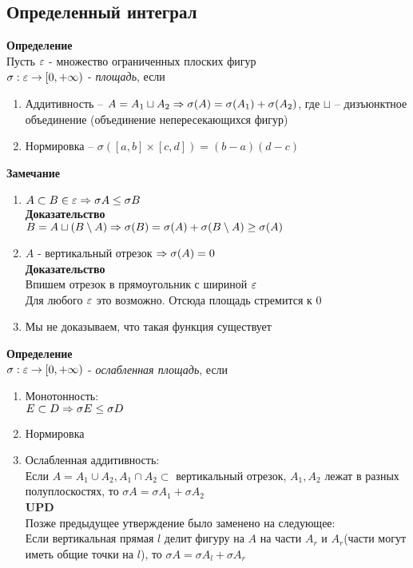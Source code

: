 \documentclass[12pt]{article}
\begin{document}
\subsection{Определенный интеграл}
\textbf{Определение}\\
Пусть $\varepsilon$ - множество ограниченных плоских фигур\\
$\sigma: \varepsilon \rightarrow [0, +\infty)$ - \textit{площадь}, если
\begin{enumerate}
    \item Аддитивность -- $A = A_1 \sqcup A_2 \Rightarrow \sigma(A) = \sigma(A_1)+\sigma(A_2)$, где $\sqcup$ -- дизъюнктное объединение (объединение непересекающихся фигур)
    \item Нормировка -- $\sigma([a,b]\times[c,d]) = (b-a)(d-c)$
\end{enumerate}
\textbf{Замечание}
\begin{enumerate}
    \item $A \subset B \in \varepsilon \Rightarrow \sigma A \leq \sigma B$\\
    \textbf{Доказательство}\\
    $B = A \sqcup (B \setminus A) \Rightarrow \sigma(B) = \sigma(A) + \sigma(B\setminus A) \geq \sigma(A)$
    \item $A$ - вертикальный отрезок $\Rightarrow \sigma(A) = 0$\\
    \textbf{Доказательство}\\
    Впишем отрезок в прямоугольник с шириной $\varepsilon$\\
    Для любого $\varepsilon$ это возможно. Отсюда площадь стремится к 0
    \item Мы не доказываем, что такая функция существует
\end{enumerate}
\textbf{Определение}\\
$\sigma: \varepsilon \rightarrow [0, +\infty)$ - \textit{ослабленная площадь}, если
\begin{enumerate}
    \item Монотонность:\\
    $E \subset D \Rightarrow \sigma E \leq \sigma D$
    \item Нормировка
    \item Ослабленная аддитивность:\\
    Если $A = A_1 \cup A_2, A_1 \cap A_2 \subset$ вертикальный отрезок, $A_1, A_2$ лежат в разных полуплоскостях, то $\sigma A = \sigma A_1 + \sigma A_2$\\
    \textbf{UPD}\\
    Позже предыдущее утверждение было заменено на следующее:\\
    Если вертикальная прямая $l$ делит фигуру на $A$ на части $A_r$ и $A_r$(части могут иметь общие точки на $l$), то $\sigma A = \sigma A_l + \sigma A_r$
\end{enumerate}
\end{document}
